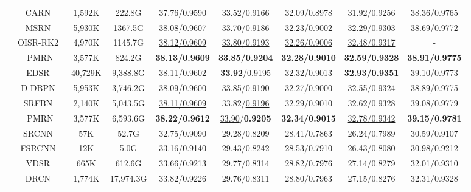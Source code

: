 \documentclass[journal]{IEEEtran}
\begin{document}
\begin{table*}[!ht]
\begin{tabular}{|c|c|c|c|c|c|c|c|c|}
		&CARN~\cite{carn}&1,592K&222.8G& 
		37.76/0.9590& 33.52/0.9166& 32.09/0.8978& 31.92/0.9256& 38.36/0.9765\\
		
		&MSRN~\cite{msrn}& 5,930K& 1367.5G& 
		38.08/0.9607& 33.70/0.9186& 32.23/0.9002& 32.29/0.9303& \underline{38.69/0.9772} \\
		
		&OISR-RK2~\cite{oisr}& 4,970K& 1145.7G&
		\underline{38.12/0.9609}& \underline{33.80/0.9193}& \underline{32.26/0.9006}& \underline{32.48/0.9317}& - \\
		
		&PMRN& 3,577K& 824.2G& 
		\textbf{38.13/0.9609}& \textbf{33.85/0.9204}& \textbf{32.28/0.9010}& \textbf{32.59/0.9328}& \textbf{38.91/0.9775} \\
		
		\cline{2-9}
		
		&EDSR~\cite{edsr_lim2017}&40,729K& 9,388.8G& 
		38.11/0.9602& \textbf{33.92}/0.9195& \underline{32.32/0.9013}& \textbf{32.93/0.9351}& \underline{39.10/0.9773}\\
		
		&D-DBPN~\cite{dbpn_haris2018deep}& 5,953K& 3,746.2G& 
		38.09/0.9600& 33.85/0.9190& 32.27/0.9000& 32.55/0.9324& 38.89/0.9775\\
		
		&SRFBN~\cite{srfbn}& 2,140K& 5,043.5G& 
		\underline{38.11/0.9609}& 33.82/\underline{0.9196}& 32.29/0.9010& 32.62/0.9328& 39.08/0.9779\\
		


		&PMRN& 3,577K& 6,593.6G&\textbf{38.22/0.9612}& \underline{33.90}/\textbf{0.9205}& \textbf{32.34/0.9015}& \underline{32.78/0.9342}& \textbf{39.15/0.9781} \\
		\hline
\hline
		\multirow{16}{*}{}& SRCNN~\cite{srcnn} &57K &52.7G & 
		32.75/0.9090& 29.28/0.8209& 28.41/0.7863& 26.24/0.7989& 30.59/0.9107\\
		
		&FSRCNN~\cite{fsrcnn}&12K&5.0G& 
		33.16/0.9140& 29.43/0.8242& 28.53/0.7910& 26.43/0.8080& 30.98/0.9212\\
		
		&VDSR~\cite{vdsr}&665K&612.6G& 
		33.66/0.9213& 29.77/0.8314& 28.82/0.7976& 27.14/0.8279& 32.01/0.9310\\
		
		&DRCN~\cite{drcn_ghifary2016deep}&1,774K&17,974.3G& 
		33.82/0.9226& 29.76/0.8311& 28.80/0.7963& 27.15/0.8276& 32.31/0.9328\\
		

\end{tabular}
\end{table*}
\end{document}
